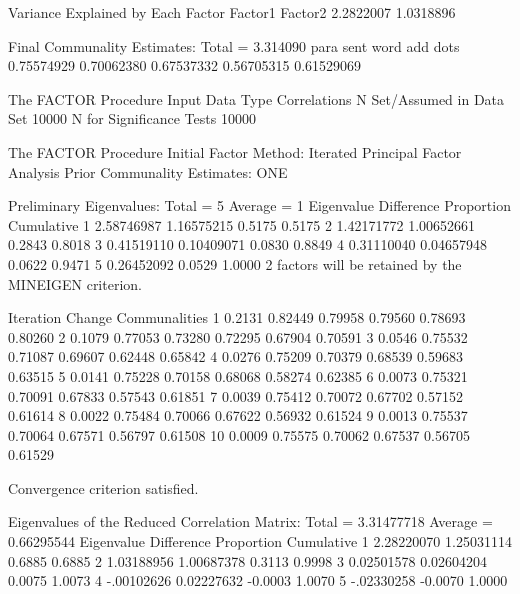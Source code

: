 \documentclass{article}
\begin{document}
\begin{Woutput}
Variance Explained by Each Factor
   Factor1         Factor2
 2.2822007       1.0318896

               Final Communality Estimates: Total = 3.314090
      para            sent            word             add            dots
0.75574929      0.70062380      0.67537332      0.56705315      0.61529069

The FACTOR Procedure
Input Data Type                Correlations
N Set/Assumed in Data Set             10000
N for Significance Tests              10000

The FACTOR Procedure
Initial Factor Method: Iterated Principal Factor Analysis
Prior Communality Estimates: ONE

       Preliminary Eigenvalues: Total = 5  Average = 1
        Eigenvalue    Difference    Proportion    Cumulative
   1    2.58746987    1.16575215        0.5175        0.5175
   2    1.42171772    1.00652661        0.2843        0.8018
   3    0.41519110    0.10409071        0.0830        0.8849
   4    0.31110040    0.04657948        0.0622        0.9471
   5    0.26452092                      0.0529        1.0000
2 factors will be retained by the MINEIGEN criterion.

Iteration    Change                       Communalities
    1        0.2131    0.82449    0.79958    0.79560    0.78693    0.80260
    2        0.1079    0.77053    0.73280    0.72295    0.67904    0.70591
    3        0.0546    0.75532    0.71087    0.69607    0.62448    0.65842
    4        0.0276    0.75209    0.70379    0.68539    0.59683    0.63515
    5        0.0141    0.75228    0.70158    0.68068    0.58274    0.62385
    6        0.0073    0.75321    0.70091    0.67833    0.57543    0.61851
    7        0.0039    0.75412    0.70072    0.67702    0.57152    0.61614
    8        0.0022    0.75484    0.70066    0.67622    0.56932    0.61524
    9        0.0013    0.75537    0.70064    0.67571    0.56797    0.61508
   10        0.0009    0.75575    0.70062    0.67537    0.56705    0.61529

Convergence criterion satisfied.

Eigenvalues of the Reduced Correlation Matrix: Total = 3.31477718  Average = 0.66295544
        Eigenvalue    Difference    Proportion    Cumulative
   1    2.28220070    1.25031114        0.6885        0.6885
   2    1.03188956    1.00687378        0.3113        0.9998
   3    0.02501578    0.02604204        0.0075        1.0073
   4    -.00102626    0.02227632       -0.0003        1.0070
   5    -.02330258                     -0.0070        1.0000


\end{Woutput}
\end{document}

